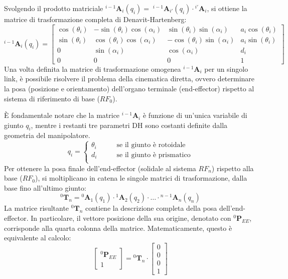 ﻿\documentclass[11pt, a4paper]{article}
\begin{document}
\noindent Svolgendo il prodotto matriciale $^{i - 1}\bm{A}_{i}(q_{i}) = \; ^{i - 1}\bm{A}_{i'}(q_{i}) \cdot {^{i'}\bm{A}_{i}}$, si ottiene la matrice di trasformazione completa di Denavit-Hartenberg:
\[
    ^{i - 1}\bm{A}_{i}(q_{i}) =
    \begin{bmatrix}
        \cos(\theta_i) & -\sin(\theta_i)\cos(\alpha_{i}) & \sin(\theta_i)\sin(\alpha_{i}) & a_{i}\cos(\theta_{i})\\
        \sin(\theta_i) & \cos(\theta_i)\cos(\alpha_{i}) & -\cos(\theta_i)\sin(\alpha_{i}) & a_{i}\sin(\theta_{i})\\
        0 & \sin(\alpha_{i}) & \cos(\alpha_{i}) & d_{i}\\
        0 & 0 & 0 & 1
    \end{bmatrix}
\]
\newpage
Una volta definita la matrice di trasformazione omogenea \(^{i-1}\mathbf{A}_{i}\) per un singolo link, è possibile risolvere il problema della cinematica diretta, ovvero determinare la posa (posizione e orientamento) dell'organo terminale (end-effector) rispetto al sistema di riferimento di base (\(RF_0\)).

È fondamentale notare che la matrice \(^{i-1}\mathbf{A}_{i}\) è funzione di un'unica variabile di giunto \(q_i\), mentre i restanti tre parametri DH sono costanti definite dalla geometria del manipolatore.
\[
    q_{i} =
    \begin{cases}
        \theta_{i} \qquad&\text{se il giunto è rotoidale}\\
        d_{i} \qquad&\text{se il giunto è prismatico}\\
    \end{cases}
\]
Per ottenere la posa finale dell'end-effector (solidale al sistema \(RF_n\)) rispetto alla base (\(RF_0\)), si moltiplicano in catena le singole matrici di trasformazione, dalla base fino all'ultimo giunto:
\[
    ^{0}\bm{T}_{n} = {^{0}\bm{A}_{1}(q_{1})} \cdot {^{1}\bm{A}_{2}(q_{2})} \cdot \dots \cdot {^{n-1}\bm{A}_{n}(q_{n})}
\]
La matrice risultante $^{0}\bm{T}_{n}$ contiene la descrizione completa della posa dell'end-effector. In particolare, il vettore posizione della sua origine, denotato con $^{0}\bm{P}_{EE}$, corrisponde alla quarta colonna della matrice. Matematicamente, questo è equivalente al calcolo:
\[
    \begin{bmatrix}
        ^{0}\bm{P}_{EE} \\
        1
    \end{bmatrix}
    = {^{0}\bm{T}_{n}} \cdot
    \begin{bmatrix}
        0 \\ 0 \\ 0 \\ 1
    \end{bmatrix}
\]
\end{document}
